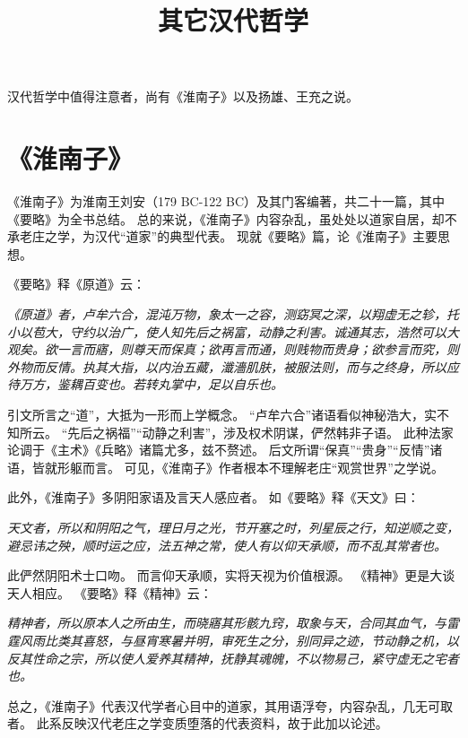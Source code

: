 \documentclass[11pt]{article}
\title{其它汉代哲学}
\date{}
\begin{document}
  \maketitle

  \linenumbers
  
汉代哲学中值得注意者，尚有《淮南子》以及扬雄、王充之说。

\section{《淮南子》}
《淮南子》为淮南王刘安（179 BC-122 BC）及其门客编著，共二十一篇，其中《要略》为全书总结。
总的来说，《淮南子》内容杂乱，虽处处以道家自居，却不承老庄之学，为汉代“道家”的典型代表。
现就《要略》篇，论《淮南子》主要思想。

\newline

《要略》释《原道》云：

\textit{《原道》者，卢牟六合，混沌万物，象太一之容，测窈冥之深，以翔虚无之轸，托小以苞大，守约以治广，使人知先后之祸富，动静之利害。诚通其志，浩然可以大观矣。欲一言而寤，则尊天而保真；欲再言而通，则贱物而贵身；欲参言而究，则外物而反情。执其大指，以内治五藏，瀸濇肌肤，被服法则，而与之终身，所以应待万方，鉴耦百变也。若转丸掌中，足以自乐也。}

引文所言之“道”，大抵为一形而上学概念。
“卢牟六合”诸语看似神秘浩大，实不知所云。
“先后之祸福”“动静之利害”，涉及权术阴谋，俨然韩非子语。
此种法家论调于《主术》《兵略》诸篇尤多，兹不赘述。
后文所谓“保真”“贵身”“反情”诸语，皆就形躯而言。
可见，《淮南子》作者根本不理解老庄“观赏世界”之学说。

\newline

此外，《淮南子》多阴阳家语及言天人感应者。
如《要略》释《天文》曰：

\textit{天文者，所以和阴阳之气，理日月之光，节开塞之时，列星辰之行，知逆顺之变，避忌讳之殃，顺时运之应，法五神之常，使人有以仰天承顺，而不乱其常者也。}

此俨然阴阳术士口吻。
而言仰天承顺，实将天视为价值根源。
《精神》更是大谈天人相应。
《要略》释《精神》云：

\textit{精神者，所以原本人之所由生，而晓寤其形骸九窍，取象与天，合同其血气，与雷霆风雨比类其喜怒，与昼宵寒暑并明，审死生之分，别同异之迹，节动静之机，以反其性命之宗，所以使人爱养其精神，抚静其魂魄，不以物易己，紧守虚无之宅者也。}

总之，《淮南子》代表汉代学者心目中的道家，其用语浮夸，内容杂乱，几无可取者。
此系反映汉代老庄之学变质堕落的代表资料，故于此加以论述。
\end{document}
